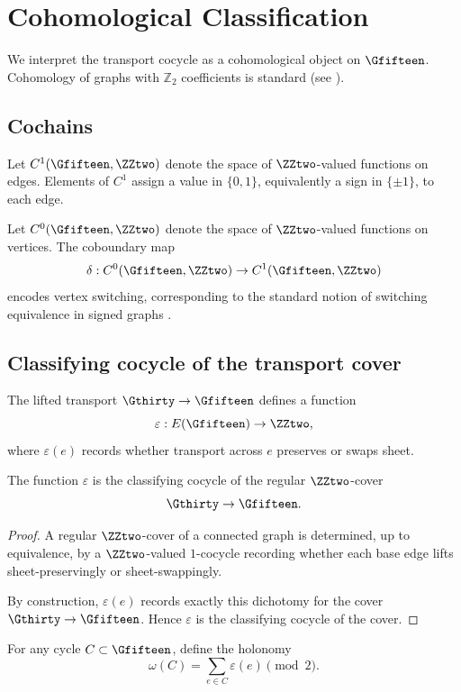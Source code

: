 \section{Cohomological Classification}

We interpret the transport cocycle as a cohomological object on
$\Gfifteen$. Cohomology of graphs with $\mathbb{Z}_2$ coefficients is
standard (see \cite{hatcher,godsil_royle}).

\subsection{Cochains}

Let $C^1(\Gfifteen,\ZZtwo)$ denote the space of $\ZZtwo$-valued functions
on edges. Elements of $C^1$ assign a value in $\{0,1\}$, equivalently a
sign in $\{\pm 1\}$, to each edge.

Let $C^0(\Gfifteen,\ZZtwo)$ denote the space of $\ZZtwo$-valued functions
on vertices. The coboundary map
\[
\delta : C^0(\Gfifteen,\ZZtwo)\to C^1(\Gfifteen,\ZZtwo)
\]
encodes vertex switching, corresponding to the standard notion of
switching equivalence in signed graphs \cite{zaslavsky}.

\subsection{Classifying cocycle of the transport cover}

The lifted transport $\Gthirty\to\Gfifteen$ defines a function
\[
\varepsilon:E(\Gfifteen)\to\ZZtwo,
\]
where $\varepsilon(e)$ records whether transport across $e$ preserves or
swaps sheet.

\begin{proposition}
The function $\varepsilon$ is the classifying cocycle of the regular
$\ZZtwo$-cover
\[
\Gthirty\to\Gfifteen.
\]
\end{proposition}

\begin{proof}
A regular $\ZZtwo$-cover of a connected graph is determined, up to
equivalence, by a $\ZZtwo$-valued $1$-cocycle recording whether each
base edge lifts sheet-preservingly or sheet-swappingly.

By construction, $\varepsilon(e)$ records exactly this dichotomy for the
cover $\Gthirty\to\Gfifteen$. Hence $\varepsilon$ is the classifying cocycle
of the cover.
\end{proof}

For any cycle $C\subset \Gfifteen$, define the holonomy
\[
\omega(C)=\sum_{e\in C}\varepsilon(e)\pmod 2.
\]

